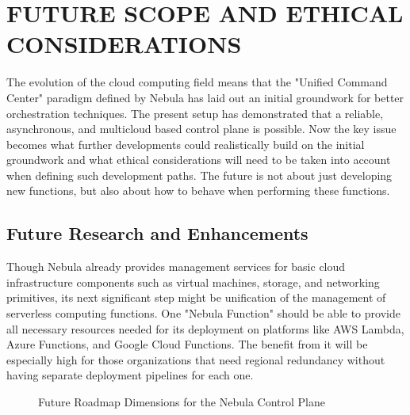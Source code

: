 \chapter{FUTURE SCOPE AND ETHICAL CONSIDERATIONS}

The evolution of the cloud computing field means that the "Unified Command Center" paradigm defined by Nebula has laid out an initial groundwork for better orchestration techniques. The present setup has demonstrated that a reliable, asynchronous, and multicloud based control plane is possible. Now the key issue becomes what further developments could realistically build on the initial groundwork and what ethical considerations will need to be taken into account when defining such development paths. The future is not about just developing new functions, but also about how to behave when performing these functions.

\section{Future Research and Enhancements}
Though Nebula already provides management services for basic cloud infrastructure components such as virtual machines, storage, and networking primitives, its next significant step might be unification of the management of serverless computing functions. One "Nebula Function" should be able to provide all necessary resources needed for its deployment on platforms like AWS Lambda, Azure Functions, and Google Cloud Functions. The benefit from it will be especially high for those organizations that need regional redundancy without having separate deployment pipelines for each one.

\begin{figure}[H]
\centering
{}
\caption{Future Roadmap Dimensions for the Nebula Control Plane}
\label{fig:future_roadmap}
\end{figure}

